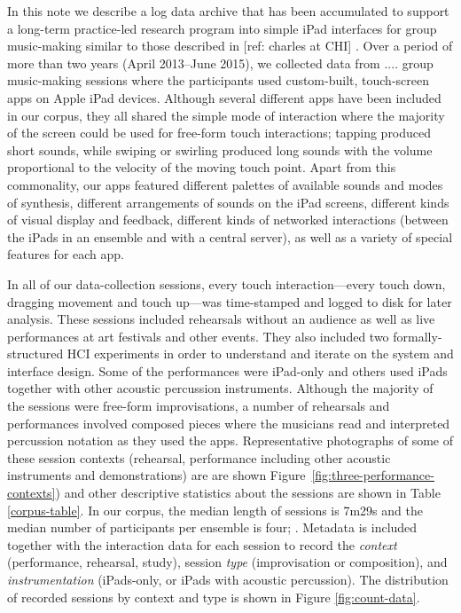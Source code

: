 \documentclass{sigchi}
\begin{document}
In this note we describe a log data archive that has been accumulated
to support a long-term practice-led research program into simple iPad
interfaces for group music-making similar to those described in [ref:
charles at CHI] . Over a period of more than two years (April
2013--June 2015), we collected data from $....$ group music-making
sessions where the participants used custom-built, touch-screen apps
on Apple iPad devices. Although several different apps have been
included in our corpus,
 they all shared
the simple mode of interaction where the majority of the screen could
be used for free-form touch interactions; tapping produced short
sounds, while swiping or swirling produced long sounds with the volume
proportional to the velocity of the moving touch point. Apart from
this commonality, our apps featured different palettes of available
sounds and modes of synthesis, different arrangements of sounds on the
iPad screens, different kinds of visual display and feedback,
different kinds of networked interactions (between the iPads in an
ensemble and with a central server), as well as a variety of special
features for each app.

In all of our data-collection sessions, every touch
interaction---every touch down, dragging movement and touch up---was
time-stamped and logged to disk for later analysis. These sessions
included rehearsals without an audience as well as live performances
at art festivals and other events. They also included two
formally-structured HCI experiments in order to understand and iterate
on the system and interface design. Some of the performances were
iPad-only and others used iPads together with other acoustic
percussion instruments. Although the majority of the sessions were
free-form improvisations, a number of rehearsals and performances
involved composed pieces where the musicians read and interpreted
percussion notation as they used the apps. Representative photographs
of some of these session contexts (rehearsal, performance including
other acoustic instruments and demonstrations) are are shown
Figure~\ref{fig:three-performance-contexts}) and other descriptive
statistics about the sessions are shown in Table \ref{corpus-table}.
In our corpus, the median length of sessions is 7m29s and the median
number of participants per ensemble is four; . Metadata is included
together with the interaction data for each session to record the
\emph{context} (performance, rehearsal, study), session \emph{type}
(improvisation or composition), and \emph{instrumentation}
(iPads-only, or iPads with acoustic percussion). The distribution of
recorded sessions by context and type is shown in Figure
\ref{fig:count-data}.
\end{document}
